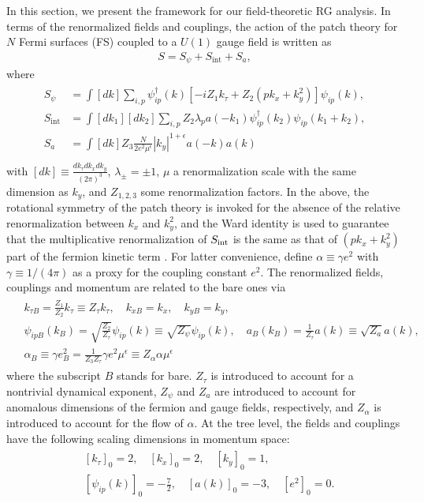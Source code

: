 \documentclass[prx,amsmath,amssymb, notitlepage, onecolumn,
nofootinbib,
superscriptaddress,
longbibliography
]{revtex4-1}
\newcommand{\beq}{\begin{eqnarray}}
\newcommand{\eeq}{\end{eqnarray}}
\begin{document}
In this section, we present the framework for our field-theoretic RG analysis. 
In terms of the renormalized fields and couplings, 
the action of the patch theory for $N$ Fermi surfaces (FS) coupled to a $U(1)$ gauge field 
is written as
\beq \label{eq: patch theory}
S = S_\psi + S_{\text{int}} + S_a,
\eeq
where 
\beq\label{eq: Lagrangian of patch theory}
\begin{split}
	S_\psi &= \int[dk] \sum_{i,p}\psi^\dagger_{ip}(k)\left[-i Z_1 k_\tau + Z_2(p k_x + k_y^2)\right]\psi_{ip}(k),\\
	S_{\text{int}} &= \int[dk_1][dk_2] \sum_{i,p}Z_2\lambda_p a(-k_1) \psi^\dagger_{ip}(k_2) \psi_{ip}(k_1+k_2),\\
	S_a &= \int[dk]Z_3\frac{N}{2e^2\mu^{\epsilon}} |k_y|^{1+\epsilon} a(-k)a(k)\\
\end{split}
\eeq
with $[dk]\equiv\frac{dk_\tau dk_x dk_y}{(2\pi)^3}$, $\lambda_\pm=\pm 1$, $\mu$ a renormalization scale with the same dimension as $k_y$, and $Z_{1,2,3}$ some renormalization factors. In the above, the rotational symmetry of the patch theory is invoked for the absence of the relative renormalization between $k_x$ and $k_y^2$, and the Ward identity is used to guarantee that 
the multiplicative renormalization of $S_{\rm int}$ is the same as
that of $(pk_x+k_y^2)$ part of the fermion kinetic term \cite{Metlitski2010}. 
For latter convenience, define $\alpha\equiv\gamma e^2$ with $\gamma\equiv 1/(4\pi)$ as a proxy for the coupling constant $e^2$. 
The renormalized fields, couplings and momentum are related to the bare ones via
\beq \label{eq: bare-renormalized relation}
\begin{split}
&k_{\tau B}=\frac{Z_1}{Z_2}k_\tau\equiv Z_\tau k_\tau,
\quad
k_{xB}=k_x,
\quad
k_{yB}=k_y,\\
&\psi_{ipB}(k_B)=\sqrt{\frac{Z_2}{Z_\tau}}\psi_{ip}(k)\equiv\sqrt{Z_\psi}\psi_{ip}(k),
\quad
a_B(k_B)=\frac{1}{Z_\tau}a(k)\equiv\sqrt{Z_a}a(k),\\
&\alpha_B\equiv\gamma e_B^2=\frac{1}{Z_3Z_\tau}\gamma e^2\mu^\epsilon\equiv Z_{\alpha}\alpha\mu^{\epsilon}
\end{split}
\eeq
where the subscript $B$ stands for bare. 
$Z_\tau$ is introduced to account for a nontrivial dynamical exponent, $Z_\psi$ and $Z_a$ are introduced to account for anomalous dimensions of the fermion and gauge fields, respectively, and $Z_{\alpha}$ is introduced to account for the flow of $\alpha$.
At the tree level,
the fields and couplings have the following scaling dimensions in momentum space:
\beq\label{eq: engineering dimensions}
\begin{split}
	&[k_\tau]_0=2,
	\quad
	[k_x]_0=2,
	\quad
	[k_y]_0=1,\\
	&[\psi_{ip}(k)]_0=-\frac{7}{2},
	\quad
	[a(k)]_0=-3,
	\quad
	[e^2]_0=0.
\end{split}
\eeq
\end{document}

